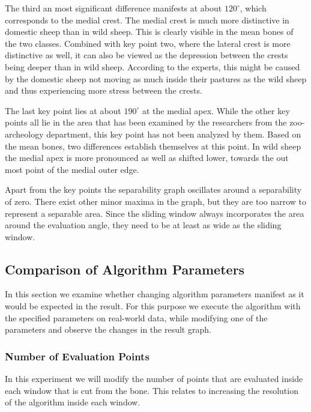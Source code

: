 \documentclass[pdftex,12pt,a4paper]{report}
\begin{document}
The third an most significant difference manifests at about $120^\circ$, which corresponds to the medial crest. The medial crest is much more distinctive in domestic sheep than in wild sheep. This is clearly visible in the mean bones of the two classes. Combined with key point two, where the lateral crest is more distinctive as well, it can also be viewed as the depression between the crests being deeper than in wild sheep. According to the experts, this might be caused by the domestic sheep not moving as much inside their pastures as the wild sheep and thus experiencing more stress between the crests.

The last key point lies at about $190^\circ$ at the medial apex. While the other key points all lie in the area that has been examined by the researchers from the zoo-archeology department, this key point has not been analyzed by them. Based on the mean bones, two differences establish themselves at this point. In wild sheep the medial apex is more pronounced as well as shifted lower, towards the out most point of the medial outer edge. 

Apart from the key points the separability graph oscillates around a separability of zero. There exist other minor maxima in the graph, but they are too narrow to represent a separable area. Since the sliding window always incorporates the area around the evaluation angle, they need to be at least as wide as the sliding window.



\subsection{Comparison of Algorithm Parameters}
\label{sub:comparisonalgorithmparameters}

In this section we examine whether changing algorithm parameters manifest as it would be expected in the result. For this purpose we execute the algorithm with the specified parameters on real-world data, while modifying one of the parameters and observe the changes in the result graph.

\subsubsection{Number of Evaluation Points}

In this experiment we will modify the number of points that are evaluated inside each window that is cut from the bone. This relates to increasing the resolution of the algorithm inside each window.
\end{document}
